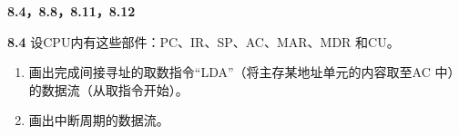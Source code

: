 \documentclass[UTF8]{report}
\newcommand{\problem}[1]{{\setlength{\parskip}{10pt}\noindent \bf{#1}}}
\begin{document}

\maketitle



\textbf{8.4，8.8，8.11，8.12}

\problem{8.4} 设CPU内有这些部件：PC、IR、SP、AC、MAR、MDR 和CU。
\begin{enumerate}[label=(\arabic*)]
    \item 画出完成间接寻址的取数指令``LDA\@X''（将主存某地址单元的内容取至AC 中）的数据流（从取指令开始）。
    \item 画出中断周期的数据流。
\end{enumerate}
\end{document}
